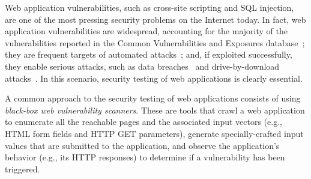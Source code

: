 Web application vulnerabilities, such as cross-site scripting and SQL
injection, are one of the most pressing security problems on the
Internet today. In fact, web application vulnerabilities are widespread, accounting
for the majority of the vulnerabilities reported in the Common
Vulnerabilities and Exposures database~\cite{cve}; they are 
frequent targets of automated attacks~\cite{small08:predator}; and, if
exploited successfully, they enable serious attacks, such as data
breaches~\cite{datalossdb} and drive-by-download
attacks~\cite{provos08:iframes}. 
In this scenario, security testing of web applications is clearly
essential.  


%


A common approach to the security testing of web applications consists
of using {\em black-box web vulnerability scanners}.
These are tools that
crawl a web
application to enumerate all the reachable pages and the associated input vectors
(e.g., HTML form fields and HTTP GET parameters), generate specially-crafted input
values that are submitted to the application, and observe the
application's behavior (e.g., its HTTP responses) to determine if a
vulnerability has been triggered.

